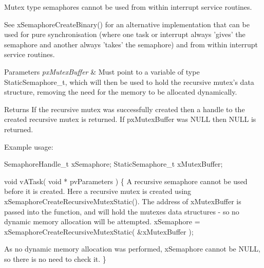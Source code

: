 Mutex type semaphores cannot be used from within interrupt service routines.

See x\-Semaphore\-Create\-Binary() for an alternative implementation that can be used for pure synchronisation (where one task or interrupt always 'gives' the semaphore and another always 'takes' the semaphore) and from within interrupt service routines.


\begin{DoxyParams}{Parameters}
{\em px\-Mutex\-Buffer} & Must point to a variable of type Static\-Semaphore\-\_\-t, which will then be used to hold the recursive mutex's data structure, removing the need for the memory to be allocated dynamically.\\
\hline
\end{DoxyParams}
\begin{DoxyReturn}{Returns}
If the recursive mutex was successfully created then a handle to the created recursive mutex is returned. If px\-Mutex\-Buffer was N\-U\-L\-L then N\-U\-L\-L is returned.
\end{DoxyReturn}
Example usage\-: 
\begin{DoxyPre}
 SemaphoreHandle\_t xSemaphore;
 StaticSemaphore\_t xMutexBuffer;\end{DoxyPre}



\begin{DoxyPre} void vATask( void * pvParameters )
 \{
A recursive semaphore cannot be used before it is created.  Here a
recursive mutex is created using xSemaphoreCreateRecursiveMutexStatic().
The address of xMutexBuffer is passed into the function, and will hold
the mutexes data structures - so no dynamic memory allocation will be
attempted.
    xSemaphore = xSemaphoreCreateRecursiveMutexStatic( &xMutexBuffer );\end{DoxyPre}



\begin{DoxyPre}As no dynamic memory allocation was performed, xSemaphore cannot be NULL,
so there is no need to check it.
 \}
 \end{DoxyPre}
 